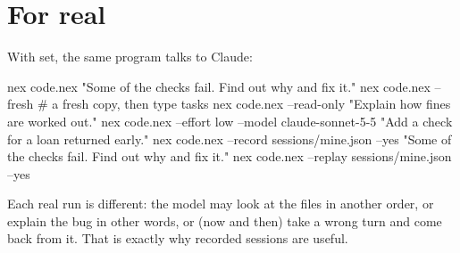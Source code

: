 \section{For real}

With  set, the same program talks to Claude:

\begin{shell}
nex code.nex "Some of the checks fail. Find out why and fix it."
nex code.nex --fresh                    # a fresh copy, then type tasks
nex code.nex --read-only "Explain how fines are worked out."
nex code.nex --effort low --model claude-sonnet-5-5 "Add a check for a loan returned early."
nex code.nex --record sessions/mine.json --yes "Some of the checks fail. Find out why and fix it."
nex code.nex --replay sessions/mine.json --yes
\end{shell}

Each real run is different: the model may look at the files in another
order, or explain the bug in other words, or (now and then) take a wrong
turn and come back from it. That is exactly why recorded sessions are
useful.
